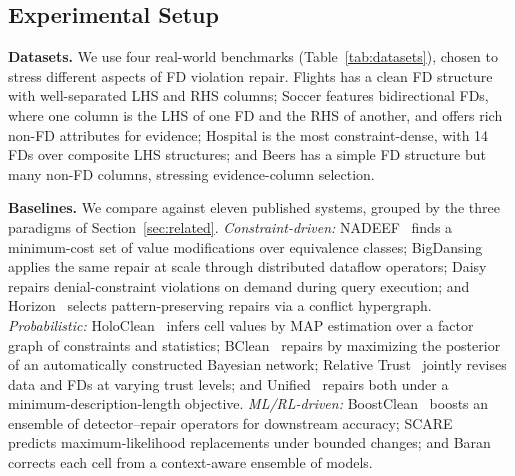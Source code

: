 \documentclass[sigconf]{acmart}
\begin{document}
\subsection{Experimental Setup}

\noindent\textbf{Datasets.}
We use four real-world benchmarks (Table~\ref{tab:datasets}), chosen to stress different aspects of FD violation repair. Flights has a clean FD structure with well-separated LHS and RHS columns; Soccer features bidirectional FDs, where one column is the LHS of one FD and the RHS of another, and offers rich non-FD attributes for evidence; Hospital is the most constraint-dense, with 14 FDs over composite LHS structures; and Beers has a simple FD structure but many non-FD columns, stressing evidence-column selection.

\begin{table}[t]
\caption{Dataset statistics and characteristics.}
\label{tab:datasets}
\centering
\small
\setlength{\tabcolsep}{3pt}
\end{table}

\noindent\textbf{Baselines.}
We compare against eleven published systems, grouped by the three paradigms of Section~\ref{sec:related}.
\emph{Constraint-driven:} NADEEF~\cite{b2} finds a minimum-cost set of value modifications over equivalence classes; BigDansing~\cite{b33} applies the same repair at scale through distributed dataflow operators; Daisy~\cite{b34} repairs denial-constraint violations on demand during query execution; and Horizon~\cite{b35} selects pattern-preserving repairs via a conflict hypergraph.
\emph{Probabilistic:} HoloClean~\cite{b1} infers cell values by MAP estimation over a factor graph of constraints and statistics; BClean~\cite{b9} repairs by maximizing the posterior of an automatically constructed Bayesian network; Relative Trust~\cite{b36} jointly revises data and FDs at varying trust levels; and Unified~\cite{b37} repairs both under a minimum-description-length objective.
\emph{ML/RL-driven:} BoostClean~\cite{b38} boosts an ensemble of detector--repair operators for downstream accuracy; SCARE~\cite{b39} predicts maximum-likelihood replacements under bounded changes; and Baran~\cite{b23} corrects each cell from a context-aware ensemble of models.
\end{document}

